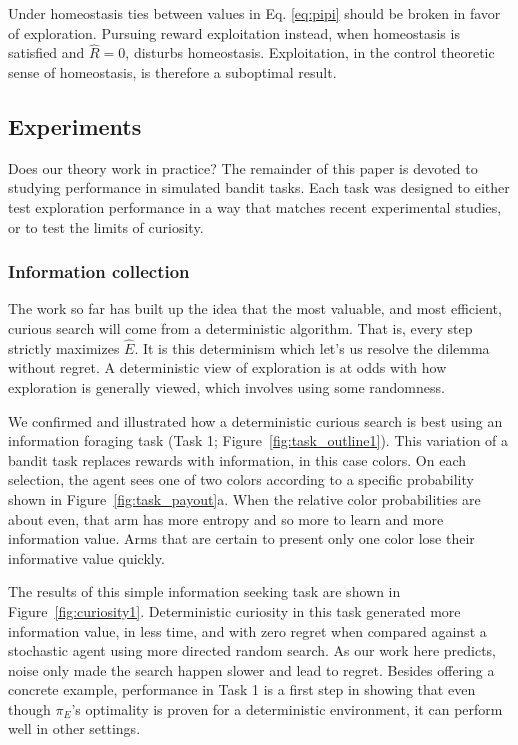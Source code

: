 Under homeostasis ties between values in Eq. \ref{eq:pipi} should be broken in favor of exploration. Pursuing reward exploitation instead, when homeostasis is satisfied and $\hat R=0$, disturbs homeostasis. Exploitation, in the control theoretic sense of homeostasis, is therefore a suboptimal result. 

\subsection*{Experiments}
Does our theory work in practice? The remainder of this paper is devoted to studying performance in simulated bandit tasks. Each task was designed to either test exploration performance in a way that matches recent experimental studies, or to test the limits of curiosity. 

\subsubsection*{Information collection}
The work so far has built up the idea that the most valuable, and most efficient, curious search will come from a deterministic algorithm. That is, every step strictly maximizes $\hat E$. It is this determinism which let's us resolve the dilemma without regret. A deterministic view of exploration is at odds with how exploration is generally viewed, which involves using some randomness. 

We confirmed and illustrated how a deterministic curious search is best using an information foraging task (Task 1; Figure~\ref{fig:task_outline1}). This variation of a bandit task \cite{Sutton2018} replaces rewards with information, in this case colors. On each selection, the agent sees one of two colors according to a specific probability shown in Figure~\ref{fig:task_payout}a. When the relative color probabilities are about even, that arm has more entropy and so more to learn and more information value. Arms that are certain to present only one color lose their informative value quickly.

The results of this simple information seeking task are shown in Figure~\ref{fig:curiosity1}. Deterministic curiosity in this task generated more information value, in less time, and with zero regret when compared against a stochastic agent using more directed random search. As our work here predicts, noise only made the search happen slower and lead to regret. Besides offering a concrete example, performance in Task 1 is a first step in showing that even though $\pi_E$'s optimality is proven for a deterministic environment, it can perform well in other settings.

